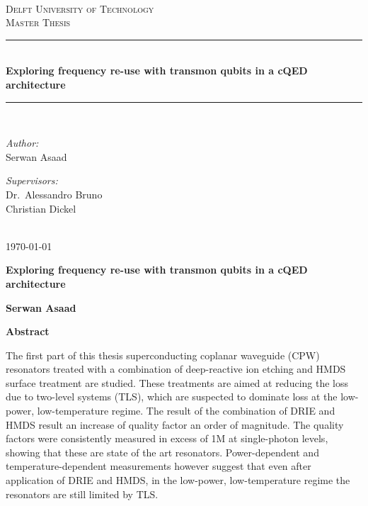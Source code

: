 \documentclass[12pt]{report}
\newcommand\blankpage{%
    \null
    \thispagestyle{empty}%
    \addtocounter{page}{-1}%
    \newpage}
\newcommand{\HRule}[1]{\rule{\linewidth}{#1}}
\begin{document}
\begin{titlepage}
\begin{center}
~\\ [4.0 cm]
\textsc{\LARGE Delft University of Technology}
\\ [3.0 cm]
\textsc{\Large Master Thesis}
\HRule{0.5 pt} \\
\LARGE \textbf{Exploring frequency re-use with transmon qubits in a cQED architecture}
\HRule{2 pt} \\ [0.5 cm]

\noindent
\begin{minipage}{0.4\textwidth}
\begin{flushleft} \large
\emph{Author:}\\
Serwan Asaad
\end{flushleft}
\end{minipage}%
\begin{minipage}{0.4\textwidth}
\begin{flushright} \large
\emph{Supervisors:} \\
Dr.~Alessandro Bruno \\
Christian Dickel
\end{flushright}
\end{minipage}
\\ [3.0 cm]
{\large \today}
\end{center}

\end{titlepage}


\author{
    Serwan Asaad
    Student ID: 4323475 \\
    Delft University of Technology \\
    Kavli Institute of Nanoscience\\
    Quantum Nanoscience Department\\
    Quantum Transport Group\\
    DiCarlo Lab}

\blankpage
\thispagestyle{plain}
\begin{center}
    \Large
    \textbf{Exploring frequency re-use with transmon qubits in a cQED architecture}


    \vspace{0.4cm}
    \textbf{Serwan Asaad}

    \vspace{0.9cm}
    \textbf{Abstract}
\end{center}
The first part of this thesis superconducting coplanar waveguide (CPW) resonators treated with a combination of deep-reactive ion etching and HMDS surface treatment are studied. These treatments are aimed at reducing the loss due to two-level systems (TLS), which are suspected to dominate loss at the low-power, low-temperature regime. The result of the combination of DRIE and HMDS result an increase of quality factor an order of magnitude. The quality factors were consistently measured in excess of 1M at single-photon levels, showing that these are state of the art resonators. Power-dependent and temperature-dependent measurements however suggest that even after application of DRIE and HMDS, in the low-power, low-temperature regime the resonators are still limited by TLS.
\end{document}
